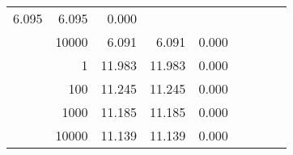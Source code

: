 \begin{table}
\begin{tabular}{rrrrrrrrr}
						
							    
							    
	                           6.095 & 6.095 & 0.000  \\
	                
	            
					 &  
					 
					\multirow{ 1 }{*}{ 10000 } &
					
						
							    
							    
	                           6.091 & 6.091 & 0.000  \\
	                
	            
	        
				\noalign{\smallskip}\hline
				\multirow{ 4 }{*}{ 2000000 } &
				
					
					 
					\multirow{ 1 }{*}{ 1 } &
					
						
							    
							    
	                           11.983 & 11.983 & 0.000  \\
	                
	            
					 &  
					 
					\multirow{ 1 }{*}{ 100 } &
					
						
							    
							    
	                           11.245 & 11.245 & 0.000  \\
	                
	            
					 &  
					 
					\multirow{ 1 }{*}{ 1000 } &
					
						
							    
							    
	                           11.185 & 11.185 & 0.000  \\
	                
	            
					 &  
					 
					\multirow{ 1 }{*}{ 10000 } &
					
						
							    
							    
	                           11.139 & 11.139 & 0.000  \\
	                
	            
	        

\hline

\end{tabular}
\end{table}
\clearpage


